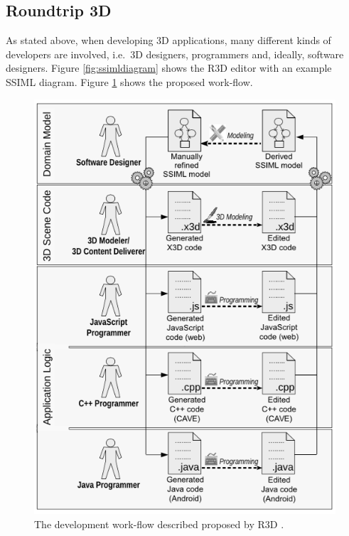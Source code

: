\subsection{Roundtrip 3D}\label{roundtrip-3d}

As stated above, when developing \gls{3D} applications, many different kinds of
developers are involved, i.e.~\gls{3D} designers, programmers and, ideally,
software designers. Figure \ref{fig:ssimldiagram} shows the \gls{R3D} editor with an example \gls{SSIML} diagram.
Figure \ref{fig:csrd} shows the proposed work-flow.

\begin{figure}
  \includegraphics[width=\textwidth]{../assets/csrd2014.png}
  \caption{The development work-flow described proposed by \gls{R3D} \cite{Jung:2015:SDA:2802768.2802837}.}
  \label{fig:csrd}
\end{figure}

